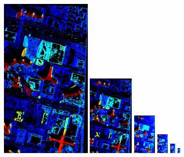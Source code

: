 \documentclass{article}
\theoremstyle{definition}
\begin{document}
\begin{figure}[th]
  \centering
  \includegraphics[width=0.4\textwidth]{images/pyr/1521741442733_pyr_depth_000.png}
  \includegraphics[width=0.2\textwidth]{images/pyr/1521741442733_pyr_depth_001.png}
  \includegraphics[width=0.1\textwidth]{images/pyr/1521741442733_pyr_depth_002.png}
  \includegraphics[width=0.05\textwidth]{images/pyr/1521741442733_pyr_depth_003.png}
  \includegraphics[width=0.025\textwidth]{images/pyr/1521741442733_pyr_depth_004.png}
  \includegraphics[width=0.0125\textwidth]{images/pyr/1521741442733_pyr_depth_005.png} \\

\end{figure}
\end{document}
